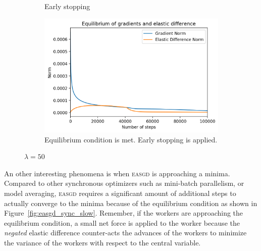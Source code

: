 \begin{figure}[H]
\begin{subfigure}{.45\textwidth}
    \caption{Early stopping}
  \end{subfigure}
  \begin{subfigure}{.45\textwidth}
    \centering
    \includegraphics[width=\linewidth]{resources/images/easgd_es_50_y_eq}
    \caption{Equilibrium condition is met. Early stopping is applied.}
  \end{subfigure}
  \caption{$\lambda = 50$}
  \label{fig:easgd_sync_lambda_50}
\end{figure}

An other interesting phenomena is when \textsc{easgd} is approaching a minima. Compared to other synchronous optimizers such as mini-batch parallelism, or model averaging, \textsc{easgd} requires a significant amount of additional steps to actually converge to the minima because of the equilibrium condition as shown in Figure~\ref{fig:easgd_sync_slow}. Remember, if the workers are approaching the equilibrium condition, a small net force is applied to the worker because the \emph{negated} elastic difference counter-acts the advances of the workers to minimize the variance of the workers with respect to the central variable.

